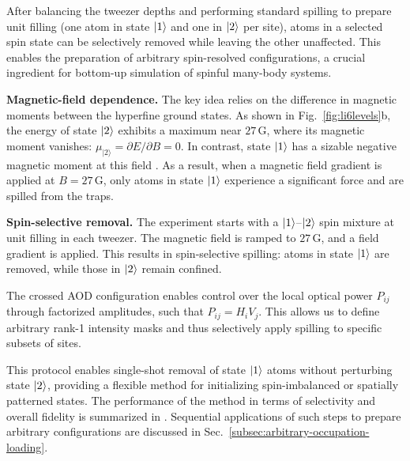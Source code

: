 
After balancing the tweezer depths and performing standard spilling to prepare unit filling (one atom in state $\left| 1 \right\rangle$ and one in $\left| 2 \right\rangle$ per site), atoms in a selected spin state can be selectively removed while leaving the other unaffected. This enables the preparation of arbitrary spin-resolved configurations, a crucial ingredient for bottom-up simulation of spinful many-body systems.

\textbf{Magnetic-field dependence.}
The key idea relies on the difference in magnetic moments between the hyperfine ground states. As shown in Fig.~\ref{fig:li6levels}b, the energy of state $\left| 2 \right\rangle$ exhibits a maximum near $27\,\mathrm{G}$, where its magnetic moment vanishes: $\mu_{|2\rangle} = \partial E / \partial B = 0$. In contrast, state $\left| 1 \right\rangle$ has a sizable negative magnetic moment at this field . As a result, when a magnetic field gradient is applied at $B = 27\,\mathrm{G}$, only atoms in state $\left| 1 \right\rangle$ experience a significant force and are spilled from the traps.

\textbf{Spin-selective removal.}
The experiment starts with a $\left| 1 \right\rangle$–$\left| 2 \right\rangle$ spin mixture at unit filling in each tweezer. The magnetic field is ramped to $27\,\mathrm{G}$, and a field gradient is applied. This results in spin-selective spilling: atoms in state $\left| 1 \right\rangle$ are removed, while those in $\left| 2 \right\rangle$ remain confined.

The crossed AOD configuration enables control over the local optical power $P_{ij}$ through factorized amplitudes, such that $P_{ij} = H_i V_j$. This allows us to define arbitrary rank-1 intensity masks and thus selectively apply spilling to specific subsets of sites. 

This protocol enables single-shot removal of state $\left| 1 \right\rangle$ atoms without perturbing state $\left| 2 \right\rangle$, providing a flexible method for initializing spin-imbalanced or spatially patterned states. The performance of the method in terms of selectivity and overall fidelity is summarized in . Sequential applications of such steps to prepare arbitrary configurations are discussed in Sec.~\ref{subsec:arbitrary-occupation-loading}.
